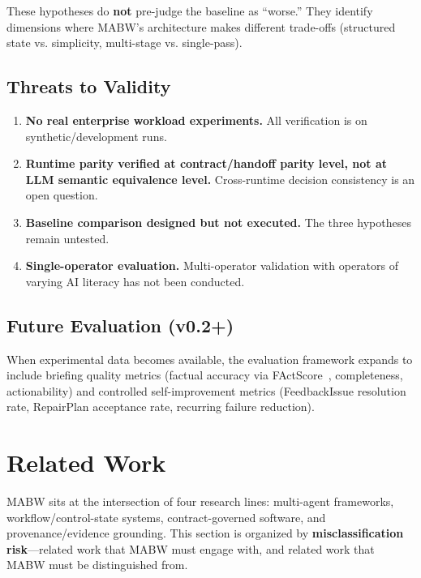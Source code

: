 \documentclass[11pt,a4paper]{article}
\begin{document}
These hypotheses do \textbf{not} pre-judge the baseline as ``worse.'' They identify dimensions where MABW's architecture makes different trade-offs (structured state vs. simplicity, multi-stage vs. single-pass).

\subsection{Threats to Validity}

\begin{enumerate}[leftmargin=*,itemsep=2pt]
    \item \textbf{No real enterprise workload experiments.} All verification is on synthetic/development runs.
    \item \textbf{Runtime parity verified at contract/handoff parity level, not at LLM semantic equivalence level.} Cross-runtime decision consistency is an open question.
    \item \textbf{Baseline comparison designed but not executed.} The three hypotheses remain untested.
    \item \textbf{Single-operator evaluation.} Multi-operator validation with operators of varying AI literacy has not been conducted.
\end{enumerate}

\subsection{Future Evaluation (v0.2+)}

When experimental data becomes available, the evaluation framework expands to include briefing quality metrics (factual accuracy via FActScore~\cite{min2023factscore}, completeness, actionability) and controlled self-improvement metrics (FeedbackIssue resolution rate, RepairPlan acceptance rate, recurring failure reduction).

\section{Related Work}
\label{sec:related}

MABW sits at the intersection of four research lines: multi-agent frameworks, workflow/control-state systems, contract-governed software, and provenance/evidence grounding. This section is organized by \textbf{misclassification risk}---related work that MABW must engage with, and related work that MABW must be distinguished from.
\end{document}
